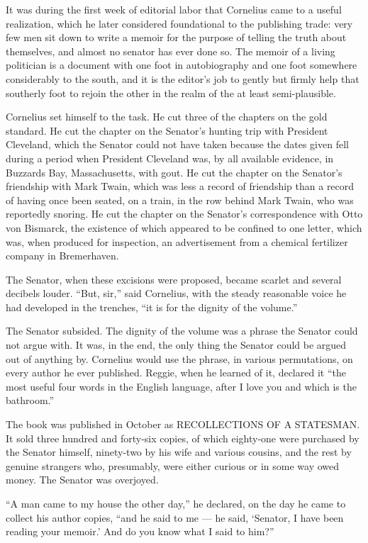 \documentclass[12pt,openright]{book}
\begin{document}
It was during the first week of editorial labor that Cornelius came to a useful realization, which he later considered foundational to the publishing trade: very few men sit down to write a memoir for the purpose of telling the truth about themselves, and almost no senator has ever done so. The memoir of a living politician is a document with one foot in autobiography and one foot somewhere considerably to the south, and it is the editor’s job to gently but firmly help that southerly foot to rejoin the other in the realm of the at least semi-plausible.

Cornelius set himself to the task. He cut three of the chapters on the gold standard. He cut the chapter on the Senator’s hunting trip with President Cleveland, which the Senator could not have taken because the dates given fell during a period when President Cleveland was, by all available evidence, in Buzzards Bay, Massachusetts, with gout. He cut the chapter on the Senator’s friendship with Mark Twain, which was less a record of friendship than a record of having once been seated, on a train, in the row behind Mark Twain, who was reportedly snoring. He cut the chapter on the Senator’s correspondence with Otto von Bismarck, the existence of which appeared to be confined to one letter, which was, when produced for inspection, an advertisement from a chemical fertilizer company in Bremerhaven.

The Senator, when these excisions were proposed, became scarlet and several decibels louder. “But, sir,” said Cornelius, with the steady reasonable voice he had developed in the trenches, “it is for the dignity of the volume.”

The Senator subsided. The dignity of the volume was a phrase the Senator could not argue with. It was, in the end, the only thing the Senator could be argued out of anything by. Cornelius would use the phrase, in various permutations, on every author he ever published. Reggie, when he learned of it, declared it “the most useful four words in the English language, after I love you and which is the bathroom.”

The book was published in October as RECOLLECTIONS OF A STATESMAN. It sold three hundred and forty-six copies, of which eighty-one were purchased by the Senator himself, ninety-two by his wife and various cousins, and the rest by genuine strangers who, presumably, were either curious or in some way owed money. The Senator was overjoyed.

“A man came to my house the other day,” he declared, on the day he came to collect his author copies, “and he said to me — he said, ‘Senator, I have been reading your memoir.’ And do you know what I said to him?”
\end{document}
